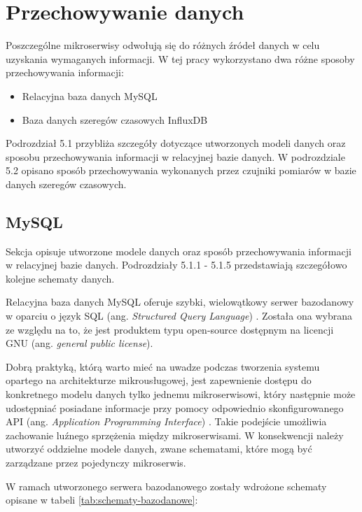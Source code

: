 \newpage
\section{Przechowywanie danych}

Poszczególne mikroserwisy odwołują się do różnych źródeł danych w celu uzyskania 
wymaganych informacji. W tej pracy wykorzystano dwa różne sposoby przechowywania 
informacji:

\begin{itemize} %
    \item Relacyjna baza danych MySQL
    \item Baza danych szeregów czasowych InfluxDB
\end{itemize}

Podrozdział 5.1 przybliża szczegóły dotyczące utworzonych modeli danych oraz sposobu 
przechowywania informacji w relacyjnej bazie danych. W podrozdziale 5.2 opisano sposób przechowywania
wykonanych przez czujniki pomiarów w bazie danych szeregów czasowych.

\subsection{MySQL}
Sekcja opisuje utworzone modele danych oraz sposób przechowywania informacji
w relacyjnej bazie danych. Podrozdziały 5.1.1 - 5.1.5 przedstawiają
szczegółowo kolejne schematy danych.

Relacyjna baza danych MySQL oferuje szybki, wielowątkowy serwer bazodanowy w oparciu 
o język SQL (ang. \textit{Structured Query Language})
\cite{mysql2022}. Została ona wybrana ze względu na to, że 
jest produktem typu open-source dostępnym na licencji GNU (ang. \textit{general public license}). 

Dobrą praktyką, którą warto mieć na uwadze podczas tworzenia systemu opartego na 
architekturze mikrousługowej, jest zapewnienie dostępu do konkretnego modelu danych tylko 
jednemu mikroserwisowi, który następnie może udostępniać posiadane informacje przy pomocy odpowiednio 
skonfigurowanego API (ang. \textit{Application Programming Interface}) \cite{richardson2021}. Takie podejście umożliwia zachowanie luźnego 
sprzężenia między mikroserwisami. W konsekwencji należy utworzyć oddzielne modele 
danych, zwane schematami, które mogą być zarządzane przez pojedynczy mikroserwis.

W ramach utworzonego serwera bazodanowego zostały wdrożone schematy opisane w tabeli \ref{tab:schematy-bazodanowe}:

